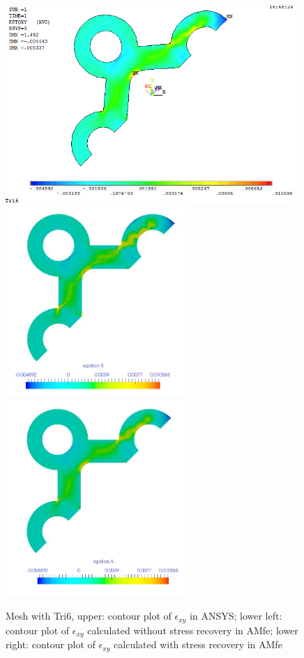 \begin{figure}[htbp]
	\begin{center}
		\includegraphics[width=11cm,clip]{Tri6_Exy.png} 	
		\includegraphics[width=7cm,clip]{Tri6_Exy_PD.png} 	
		\includegraphics[width=7cm,clip]{Tri6_Exy_P.png} 		
		\caption{Mesh with Tri6, upper: contour plot of $\epsilon_{xy}$ in ANSYS; lower left: contour plot of $\epsilon_{xy}$ calculated without stress recovery in AMfe; lower right: contour plot of $\epsilon_{xy}$ calculated with stress recovery in AMfe} \label{fig: Tri6_Exy}
	\end{center}
\end{figure}
\clearpage 

